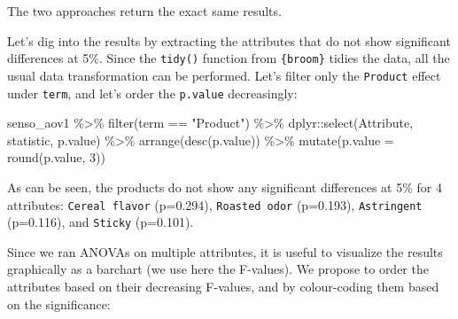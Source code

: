 \documentclass[
]{book}
\newenvironment{Shaded}{\begin{snugshade}}{\end{snugshade}}
\newcommand{\AttributeTok}[1]{\textcolor[rgb]{0.77,0.63,0.00}{#1}}
\newcommand{\DecValTok}[1]{\textcolor[rgb]{0.00,0.00,0.81}{#1}}
\newcommand{\FunctionTok}[1]{\textcolor[rgb]{0.00,0.00,0.00}{#1}}
\newcommand{\NormalTok}[1]{#1}
\newcommand{\SpecialCharTok}[1]{\textcolor[rgb]{0.00,0.00,0.00}{#1}}
\newcommand{\StringTok}[1]{\textcolor[rgb]{0.31,0.60,0.02}{#1}}
\begin{document}
The two approaches return the exact same results.

Let's dig into the results by extracting the attributes that do not show significant differences at 5\%. Since the \texttt{tidy()} function from \texttt{\{broom\}} tidies the data, all the usual data transformation can be performed. Let's filter only the \texttt{Product} effect under \texttt{term}, and let's order the \texttt{p.value} decreasingly:

\begin{Shaded}
\begin{Highlighting}[]
\NormalTok{senso\_aov1 }\SpecialCharTok{\%\textgreater{}\%} 
  \FunctionTok{filter}\NormalTok{(term }\SpecialCharTok{==} \StringTok{"Product"}\NormalTok{) }\SpecialCharTok{\%\textgreater{}\%} 
\NormalTok{  dplyr}\SpecialCharTok{::}\FunctionTok{select}\NormalTok{(Attribute, statistic, p.value) }\SpecialCharTok{\%\textgreater{}\%} 
  \FunctionTok{arrange}\NormalTok{(}\FunctionTok{desc}\NormalTok{(p.value)) }\SpecialCharTok{\%\textgreater{}\%} 
  \FunctionTok{mutate}\NormalTok{(}\AttributeTok{p.value =} \FunctionTok{round}\NormalTok{(p.value, }\DecValTok{3}\NormalTok{))}
\end{Highlighting}
\end{Shaded}

As can be seen, the products do not show any significant differences at 5\% for 4 attributes: \texttt{Cereal\ flavor} (p=0.294), \texttt{Roasted\ odor} (p=0.193), \texttt{Astringent} (p=0.116), and \texttt{Sticky} (p=0.101).

Since we ran ANOVAs on multiple attributes, it is useful to visualize the results graphically as a barchart (we use here the F-values). We propose to order the attributes based on their decreasing F-values, and by colour-coding them based on the significance:
\end{document}
